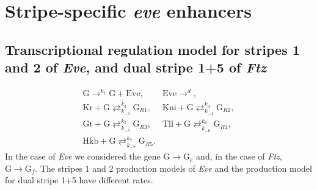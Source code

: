 \documentclass[final,authoryear, 5p, times]{elsarticle}
\begin{document}
\appendix 

\section{Stripe-specific \textit{eve} enhancers}\label{AppA}

\subsection{Transcriptional regulation model for stripes 1 and 2 of \textit{Eve}, and dual stripe 1+5 of \textit{Ftz}}

\begin{equation} \label{S1-2systemSup}
    \begin{array}{ll}
        \displaystyle
        \text{G} \mathop{\longrightarrow}^{k_{1}} \text{G} + \text{Eve}, &\displaystyle
        \text{Eve} \mathop{\longrightarrow}^{d},\\ \displaystyle
        \text{Kr} + \text{G} \mathop{\rightleftarrows}^{k_{3}}_{k_{-3}} \text{G}_{R1}, &\displaystyle
        \text{Kni} + \text{G}\mathop{\rightleftarrows}^{k_{4}}_{k_{-4}} \text{G}_{R2},\\ \displaystyle
        \text{Gt} + \text{G} \mathop{\rightleftarrows}^{k_{5}}_{k_{-5}} \text{G}_{R3}, &\displaystyle
        \text{Tll} + \text{G} \mathop{\rightleftarrows}^{k_{6}}_{k_{-6}} \text{G}_{R4}, \\ \displaystyle
        \text{Hkb} + \text{G} \mathop{\rightleftarrows}^{k_{7}}_{k_{-7}} \text{G}_{R5}. &
    \end{array}
\end{equation} 
In the case of \textit{Eve} we considered the gene  $\text{G}\to  \text{G}_e$ and,  in the case of \textit{Ftz}, $\text{G}\to  \text{G}_f$. The stripes 1 and 2 production models of  \textit{Eve} and the production model for dual stripe 1+5  have different rates.
\end{document}
